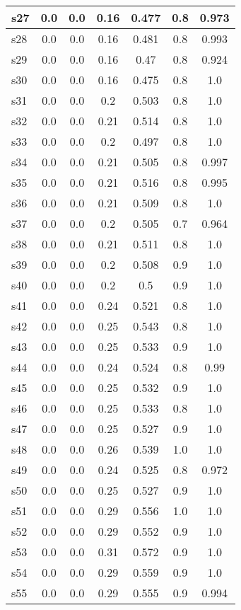 \documentclass{article}
\begin{document}
\begin{tabular}{|l|c|c|c|c|c|c|}
\hline
s27 &0.0 & 0.0 & 0.16 & 0.477 & 0.8 & 0.973\\
\hline
s28 &0.0 & 0.0 & 0.16 & 0.481 & 0.8 & 0.993\\
\hline
s29 &0.0 & 0.0 & 0.16 & 0.47 & 0.8 & 0.924\\
\hline
s30 &0.0 & 0.0 & 0.16 & 0.475 & 0.8 & 1.0\\
\hline
s31 &0.0 & 0.0 & 0.2 & 0.503 & 0.8 & 1.0\\
\hline
s32 &0.0 & 0.0 & 0.21 & 0.514 & 0.8 & 1.0\\
\hline
s33 &0.0 & 0.0 & 0.2 & 0.497 & 0.8 & 1.0\\
\hline
s34 &0.0 & 0.0 & 0.21 & 0.505 & 0.8 & 0.997\\
\hline
s35 &0.0 & 0.0 & 0.21 & 0.516 & 0.8 & 0.995\\
\hline
s36 &0.0 & 0.0 & 0.21 & 0.509 & 0.8 & 1.0\\
\hline
s37 &0.0 & 0.0 & 0.2 & 0.505 & 0.7 & 0.964\\
\hline
s38 &0.0 & 0.0 & 0.21 & 0.511 & 0.8 & 1.0\\
\hline
s39 &0.0 & 0.0 & 0.2 & 0.508 & 0.9 & 1.0\\
\hline
s40 &0.0 & 0.0 & 0.2 & 0.5 & 0.9 & 1.0\\
\hline
s41 &0.0 & 0.0 & 0.24 & 0.521 & 0.8 & 1.0\\
\hline
s42 &0.0 & 0.0 & 0.25 & 0.543 & 0.8 & 1.0\\
\hline
s43 &0.0 & 0.0 & 0.25 & 0.533 & 0.9 & 1.0\\
\hline
s44 &0.0 & 0.0 & 0.24 & 0.524 & 0.8 & 0.99\\
\hline
s45 &0.0 & 0.0 & 0.25 & 0.532 & 0.9 & 1.0\\
\hline
s46 &0.0 & 0.0 & 0.25 & 0.533 & 0.8 & 1.0\\
\hline
s47 &0.0 & 0.0 & 0.25 & 0.527 & 0.9 & 1.0\\
\hline
s48 &0.0 & 0.0 & 0.26 & 0.539 & 1.0 & 1.0\\
\hline
s49 &0.0 & 0.0 & 0.24 & 0.525 & 0.8 & 0.972\\
\hline
s50 &0.0 & 0.0 & 0.25 & 0.527 & 0.9 & 1.0\\
\hline
s51 &0.0 & 0.0 & 0.29 & 0.556 & 1.0 & 1.0\\
\hline
s52 &0.0 & 0.0 & 0.29 & 0.552 & 0.9 & 1.0\\
\hline
s53 &0.0 & 0.0 & 0.31 & 0.572 & 0.9 & 1.0\\
\hline
s54 &0.0 & 0.0 & 0.29 & 0.559 & 0.9 & 1.0\\
\hline
s55 &0.0 & 0.0 & 0.29 & 0.555 & 0.9 & 0.994\\

\end{tabular}
\end{document}

